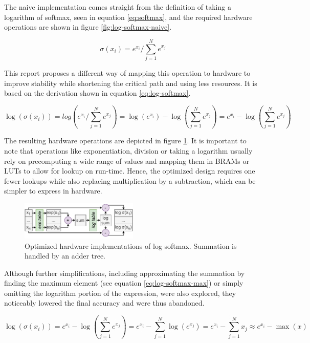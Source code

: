 The naive implementation comes straight from the definition of taking a logarithm of softmax, seen in equation \ref{eq:softmax}, and the required hardware operations are shown in figure \ref{fig:log-softmax-naive}.

\begin{equation} \label{eq:softmax}
    \sigma (x_i) = e^{x_i} / \sum_{j=1}^{N} e^{x_j}
\end{equation}

This report proposes a different way of mapping this operation to hardware to improve stability while shortening the critical path and using less resources. It is based on the derivation shown in equation \ref{eq:log-softmax}.

\begin{equation} \label{eq:log-softmax}
    \log (\sigma (x_i)) = log(e^{x_i} / \sum_{j=1}^{N} e^{x_j}) = \log(e^{x_i}) - \log(\sum_{j=1}^{N} e^{x_j}) = e^{x_i} - \log(\sum_{j=1}^{N} e^{x_j})
\end{equation}

The resulting hardware operations are depicted in figure \ref{fig:log-softmax-opt}. It is important to note that operations like exponentiation, division or taking a logarithm usually rely on precomputing a wide range of values and mapping them in BRAMs or LUTs to allow for lookup on run-time. Hence, the optimized design requires one fewer lookups while also replacing multiplication by a subtraction, which can be simpler to express in hardware.

\begin{figure}[hpt!]
  \centering
  \includegraphics[trim={0cm 0cm 0cm 0cm}, width=0.5\textwidth, center]{quantization/log_softmax_opt_h.pdf}
  \caption{Optimized hardware implementations of log softmax. Summation is handled by an adder tree.}
  \label{fig:log-softmax-opt}
\end{figure}

\clearpage
Although further simplifications, including approximating the summation by finding the maximum element (see equation \ref{eq:log-softmax-max}) or simply omitting the logarithm portion of the expression, were also explored, they noticeably lowered the final accuracy and were thus abandoned.

\begin{equation} \label{eq:log-softmax-max}
    \log (\sigma (x_i)) = e^{x_i} - \log(\sum_{j=1}^{N} e^{x_j}) = e^{x_i} - \sum_{j=1}^{N} \log(e^{x_j}) = e^{x_i} - \sum_{j=1}^{N} x_j \approx e^{x_i} - \max(x)
\end{equation}


